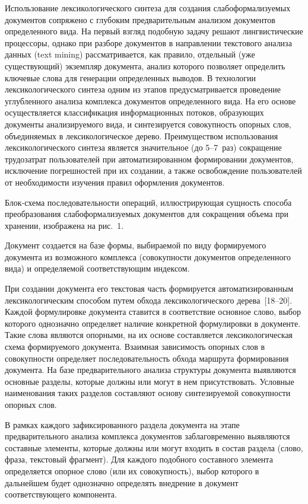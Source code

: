 \begin{multicols}{2}
     Использование лексикологического синтеза для создания 
слабоформализуемых документов сопряжено с глубоким предварительным 
анализом документов определенного вида. На первый взгляд\linebreak
подобную задачу 
решают лингвистические про\-цессоры, однако при разборе документов в 
направлении текстового анализа данных (text mining) рассматривается, как 
правило, отдельный (уже су\-щест\-ву\-ющий) экземпляр документа, анализ 
которого позволяет определить ключевые слова для генерации определенных 
выводов. В технологии лексикологического синтеза одним из этапов 
преду\-смат\-ри\-ва\-ет\-ся проведение углубленного анализа комплекса документов 
определенного вида. На его основе осуществляется классификация 
информационных потоков, образующих документы анализируемого вида, и 
синтезируется совокупность опорных слов, объединяемых в лексикологическое 
дерево. Преимуществом использования лексикологического синтеза является 
значительное (до 5--7~раз) сокращение трудозатрат пользователей при 
автоматизированном формировании документов, исключение погрешностей 
при их создании, а также освобождение пользователей от необходимости 
изучения правил оформления документов.
     
     Блок-схема последовательности операций, иллюстрирующая сущность 
способа преобразования слабоформализуемых документов для сокращения 
объема при хранении, изображена на рис.~1.
     
     Документ создается на базе формы, вы\-би\-ра\-емой по виду формируемого 
документа из возможного комплекса (совокупности документов определенного 
вида) и определяемой соответствующим индексом.


     При создании документа его текстовая часть формируется 
автоматизированным лексикологическим способом путем обхода 
лексикологического дерева~[18--20]. Каждой формулировке 
документа ставится в соответствие основное слово, выбор которого однозначно 
определяет наличие конкретной формулировки в документе. Такие слова 
являются опорными, на их основе составляется лексикологическая схема 
формируемого документа. Взаимная зависимость опорных слов в совокупности 
определяет последовательность обхода маршрута формирования документа. На 
базе предварительного анализа структуры документа выявляются основные 
разделы, которые должны или могут в нем присутствовать. Условные 
наименования таких разделов составляют основу синтезируемой совокупности 
опорных слов.
     
     В рамках каждого зафиксированного раздела документа на этапе 
предварительного анализа комплекса документов заблаговременно выявляются 
составные элементы, которые должны или могут входить в состав раздела 
(слово, фраза, текстовый фрагмент). Для каждого подобного составного 
элемента определяется опорное слово (или их совокупность), выбор которого в 
дальнейшем будет однозначно определять внедрение в документ 
соответствующего компонента.
     

\end{multicols}
